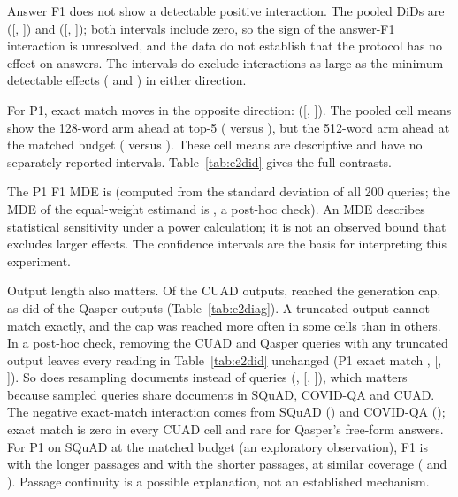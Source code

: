\documentclass[11pt]{article}
\begin{document}
Answer F1 does not show a detectable positive interaction. The pooled DiDs are \EtwoPoneFone{} ([\EtwoPoneFoneLo, \EtwoPoneFoneHi]) and \EtwoSthreeFone{} ([\EtwoSthreeFoneLo, \EtwoSthreeFoneHi]); both intervals include zero, so the sign of the answer-F1 interaction is unresolved, and the data do not establish that the protocol has no effect on answers. The intervals do exclude interactions as large as the minimum detectable effects (\EtwoPoneFoneMde{} and \EtwoSthreeFoneMde{}) in either direction.

For P1, exact match moves in the opposite direction: \EtwoPoneEm{} ([\EtwoPoneEmLo, \EtwoPoneEmHi]). The pooled cell means show the 128-word arm ahead at top-5 (\EtwoEmOneTwoEightCount{} versus \EtwoEmFiveTwelveCount), but the 512-word arm ahead at the matched budget (\EtwoEmFiveTwelveBudget{} versus \EtwoEmOneTwoEightBudget). These cell means are descriptive and have no separately reported intervals. Table~\ref{tab:e2did} gives the full contrasts.


The P1 F1 MDE is \EtwoPoneFoneMde{} (computed from the standard deviation of all 200 queries; the MDE of the equal-weight estimand is \EtwoPoneFoneMdeStrat{}, a post-hoc check). An MDE describes statistical sensitivity under a power calculation; it is not an observed bound that excludes larger effects. The confidence intervals are the basis for interpreting this experiment.

Output length also matters. Of the \EtwoJobsCuad{} CUAD outputs, \EtwoTruncCuad{} reached the generation cap, as did \EtwoTruncQasper{} of the \EtwoJobsQasper{} Qasper outputs (Table~\ref{tab:e2diag}). A truncated output cannot match exactly, and the cap was reached more often in some cells than in others. In a post-hoc check, removing the \EtwoTruncQueriesCuad{} CUAD and \EtwoTruncQueriesQasper{} Qasper queries with any truncated output leaves every reading in Table~\ref{tab:e2did} unchanged (P1 exact match \EtwoPoneEmUntrunc, [\EtwoPoneEmUntruncLo, \EtwoPoneEmUntruncHi]). So does resampling documents instead of queries (\EtwoPoneEmDoc, [\EtwoPoneEmDocLo, \EtwoPoneEmDocHi]), which matters because sampled queries share documents in SQuAD, COVID-QA and CUAD. The negative exact-match interaction comes from SQuAD (\EtwoPoneEmSquad) and COVID-QA (\EtwoPoneEmCovid); exact match is zero in every CUAD cell and rare for Qasper's free-form answers. For P1 on SQuAD at the matched budget (an exploratory observation), F1 is \EtwoSquadFiveTwelveBudgetFone{} with the longer passages and \EtwoSquadOneTwoEightBudgetFone{} with the shorter passages, at similar coverage (\EtwoSquadFiveTwelveBudgetCov{} and \EtwoSquadOneTwoEightBudgetCov{}). Passage continuity is a possible explanation, not an established mechanism.
\end{document}
